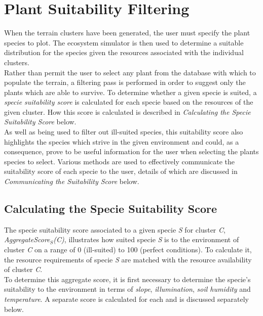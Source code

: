 \section{Plant Suitability Filtering}

When the terrain clusters have been generated, the user must specify the plant species to plot. The ecosystem simulator is then used to determine a suitable distribution for the species given the resources associated with the individual clusters.\\

Rather than permit the user to select any plant from the database with which to populate the terrain, a filtering pass is performed in order to suggest only the plants which are able to survive. To determine whether a given specie is suited, a \textit{specie suitability score} is calculated for each specie based on the resources of the given cluster. How this score is calculated is described in \textit{Calculating the Specie Suitability Score} below.\\

As well as being used to filter out ill-suited species, this suitability score also highlights the species which strive in the given environment and could, as a consequence, prove to be useful information for the user when selecting the plants species to select. Various methods are used to effectively communicate the suitability score of each specie to the user, details of which are discussed in \textit{Communicating the Suitability Score} below.

\subsection{Calculating the Specie Suitability Score}

The specie suitability score associated to a given specie \textit{S} for cluster \textit{C}, \textit{AggregateScore$_{S}$(C)}, illustrates how suited specie \textit{S} is to the environment of cluster \textit{C} on a range of 0 (ill-suited) to 100 (perfect conditions). To calculate it, the resource requirements of specie \textit{S} are matched with the resource availability of cluster \textit{C}.\\

To determine this aggregate score, it is first necessary to determine the specie's suitability to the environment in terms of \textit{slope}, \textit{illumination}, \textit{soil humidity} and \textit{temperature}. A separate score is calculated for each and is discussed separately below. 

